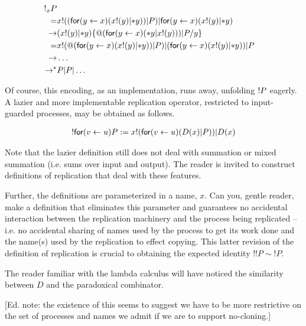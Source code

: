 \begin{eqnarray}
	\bangp_{x}{P} & & \nonumber\\
	=
	& \lift{x}{(\prefix{x}{y}{(\outputp{x}{y} | \dropn{y})) | P}} 
	      | \prefix{x}{y}{(\outputp{x}{y} | \dropn{y})} & \nonumber\\
	\red
	& (\outputp{x}{y} | \dropn{y})\substn{\quotep{(\prefix{x}{y}{(\dropn{y} | \outputp{x}{y})) | P}}}{y} & \nonumber\\
	=
	& \outputp{x}{\quotep{(\prefix{x}{y}{(\outputp{x}{y} | \dropn{y})) | P}}}
	  | {(\prefix{x}{y}{(\outputp{x}{y} | \dropn{y})) | P}} & \nonumber\\
	\red
	& \ldots & \nonumber\\
	\red^*
	& P | P | \ldots & \nonumber
\end{eqnarray}

Of course, this encoding, as an implementation, runs away, unfolding
$\bangp{P}$ eagerly. A lazier and more implementable replication
operator, restricted to input-guarded processes, may be obtained as follows.

\begin{eqnarray}
\bangp{\prefix{u}{v}{P}} 
	:= 
	\binpar{\lift{x}{\prefix{u}{v}{(\binpar{D(x)}{P})}}}{D(x)} \nonumber
\end{eqnarray}

\begin{remark}
  Note that the lazier definition still does not deal with summation
  or mixed summation (i.e. sums over input and output). The reader is
  invited to construct definitions of replication that deal with these
  features. 

  Further, the definitions are parameterized in a name, $x$. Can you,
  gentle reader, make a definition that eliminates this parameter and
  guarantees no accidental interaction between the replication
  machinery and the process being replicated -- i.e. no accidental
  sharing of names used by the process to get its work done and the
  name(s) used by the replication to effect copying. This latter
  revision of the definition of replication is crucial to obtaining
  the expected identity $!!P \sim !P$.
\end{remark}

\begin{remark}\label{rem:paradoxical_combinator}
  The reader familiar with the lambda calculus will have noticed the
  similarity between $D$ and the paradoxical combinator.

  [Ed. note: the existence of this seems to suggest we have to be more
  restrictive on the set of processes and names we admit if we are to
  support no-cloning.]
\end{remark}

